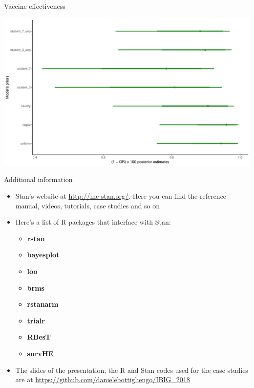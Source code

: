 \documentclass[ignorenonframetext,a4paper]{beamer}
\providecommand{\tightlist}{%
  \setlength{\itemsep}{0pt}\setlength{\parskip}{0pt}}
\begin{document}
\begin{frame}{Vaccine effectiveness}

\includegraphics{DB_presentation_case_study_files/figure-beamer/unnamed-chunk-37-1.pdf}

\end{frame}

\begin{frame}{Additional information}

\begin{itemize}
\item
  Stan's website at \url{http://mc-stan.org/}. Here you can find the
  reference manual, videos, tutorials, case studies and so on
\item
  Here's a list of R packages that interface with Stan:

  \begin{itemize}
  \tightlist
  \item
    \textbf{rstan}
  \item
    \textbf{bayesplot}
  \item
    \textbf{loo}
  \item
    \textbf{brms}
  \item
    \textbf{rstanarm}
  \item
    \textbf{trialr}
  \item
    \textbf{RBesT}
  \item
    \textbf{survHE}
  \end{itemize}
\item
  The slides of the presentation, the R and Stan codes used for the case
  studies are at \url{https://github.com/danielebottigliengo/IBIG_2018}
\end{itemize}

\end{frame}
\end{document}
